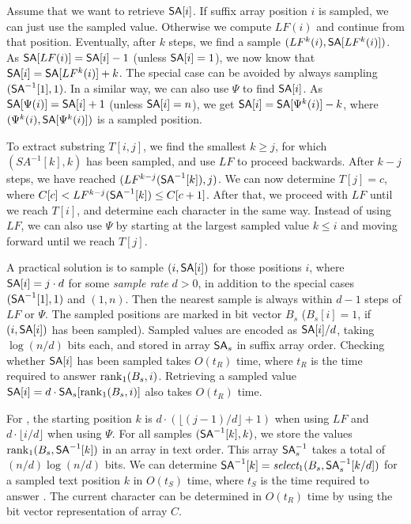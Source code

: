 Assume that we want to retrieve $\mathsf{SA}[i]$. If suffix array position $i$ is sampled, we can just use the sampled value. Otherwise we compute $LF(i)$ and continue from that position. Eventually, after $k$ steps, we find a sample $(LF^{k}(i), \mathsf{SA}[LF^{k}(i)])$. As $\mathsf{SA}[LF(i)] = \mathsf{SA}[i] - 1$ (unless $\mathsf{SA}[i] = 1$), we now know that $\mathsf{SA}[i] = \mathsf{SA}[LF^{k}(i)] + k$. The special case can be avoided by always sampling $(\mathsf{SA}^{-1}[1], 1)$. In a similar way, we can also use $\Psi$ to find $\mathsf{SA}[i]$. As $\mathsf{SA}[\Psi(i)] = \mathsf{SA}[i] + 1$ (unless $\mathsf{SA}[i] = n$), we get $\mathsf{SA}[i] = \mathsf{SA}[\Psi^{k}(i)] - k$, where $(\Psi^{k}(i), \mathsf{SA}[\Psi^{k}(i)])$ is a sampled position.

To extract substring $T[i,j]$, we find the smallest $k \ge j$, for which $(SA^{-1}[k],k)$ has been sampled, and use $LF$ to proceed backwards. After $k - j$ steps, we have reached $(LF^{k-j}(\mathsf{SA}^{-1}[k]), j)$. We can now determine $T[j] = c$, where $C[c] < LF^{k-j}(\mathsf{SA}^{-1}[k]) \le C[c+1]$. After that, we proceed with $LF$ until we reach $T[i]$, and determine each character in the same way. Instead of using $LF$, we can also use $\Psi$ by starting at the largest sampled value $k \le i$ and moving forward until we reach $T[j]$.

A practical solution is to sample $(i, \mathsf{SA}[i])$ for those positions $i$, where $\mathsf{SA}[i] = j \cdot d$ for some \emph{sample rate} $d > 0$, in addition to the special cases $(\mathsf{SA}^{-1}[1],1)$ and $(1,n)$. Then the nearest sample is always within $d-1$ steps of $LF$ or $\Psi$. The sampled positions are marked in bit vector $B_{s}$ ($B_{s}[i] = 1$, if $(i, \mathsf{SA}[i])$ has been sampled). Sampled values are encoded as $\mathsf{SA}[i] / d$, taking $\log (n/d)$ bits each, and stored in array $\mathsf{SA}_{s}$ in suffix array order. Checking whether $\mathsf{SA}[i]$ has been sampled takes $O(t_{R})$ time, where $t_{R}$ is the time required to answer $\operatorname{rank}_{1}(B_{s}, i)$. Retrieving a sampled value $\mathsf{SA}[i] = d \cdot \mathsf{SA}_{s}[\operatorname{rank}_{1}(B_{s}, i)]$ also takes $O(t_{R})$ time.

For \extract, the starting position $k$ is $d \cdot (\lfloor (j-1) / d \rfloor + 1)$ when using $LF$ and $d \cdot \lfloor i / d \rfloor$ when using $\Psi$. For all samples $(\mathsf{SA}^{-1}[k], k)$, we store the values $\operatorname{rank}_{1}(B_{s}, \mathsf{SA}^{-1}[k])$ in an array in text order. This array $\mathsf{SA}^{-1}_{s}$ takes a total of $(n/d) \log (n/d)$ bits. We can determine $\mathsf{SA}^{-1}[k] = \emph{select}_{1}(B_{s}, \mathsf{SA}^{-1}_{s}[k / d])$ for a sampled text position $k$ in $O(t_{S})$ time, where $t_{S}$ is the time required to answer \select. The current character can be determined in $O(t_{R})$ time by using the bit vector representation of array $C$.

